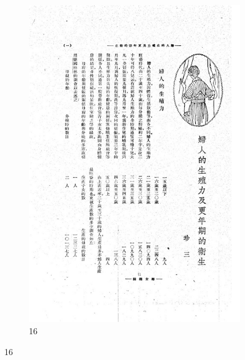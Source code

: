 \documentclass[12pt,twoside]{report}
\begin{document}
\begin{appendices}
\begin{figure}[htbp]
\begin{subfigure}[b]{0.23\linewidth}
        \includegraphics[width=\linewidth]{./figures/testset/16.jpg}
        \caption{16}
        \label{fig:test_16}
    \end{subfigure}


\end{figure}
\end{appendices}
\end{document}
